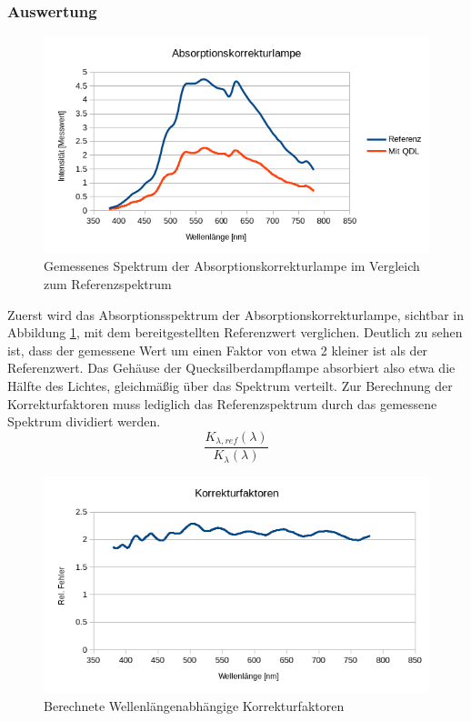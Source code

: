 \subsubsection{Auswertung}

\begin{figure}[h]
	\centering
	\includegraphics[scale=0.8]{Images/V2_AKL.png}
	\caption{Gemessenes Spektrum der Absorptionskorrekturlampe im Vergleich zum Referenzspektrum}
	\label{V2_AKL}
\end{figure}

Zuerst wird das Absorptionsspektrum der Absorptionskorrekturlampe, sichtbar in Abbildung \ref{V2_AKL}, mit dem bereitgestellten Referenzwert verglichen. Deutlich zu sehen ist, dass der gemessene Wert um einen Faktor von etwa 2 kleiner ist als der Referenzwert. Das Gehäuse der Quecksilberdampflampe absorbiert also etwa die Hälfte des Lichtes, gleichmäßig über das Spektrum verteilt.
Zur Berechnung der Korrekturfaktoren muss lediglich das Referenzspektrum durch das gemessene Spektrum dividiert werden.
\begin{equation}
\frac{K_{\lambda,ref}(\lambda)}{K_{\lambda}(\lambda)}
\end{equation}

\begin{figure}[h]
	\centering
	\includegraphics[scale=0.7]{Images/V2_Korr.png}
	\caption{Berechnete Wellenlängenabhängige Korrekturfaktoren}
	\label{V2_KOR}
\end{figure}

